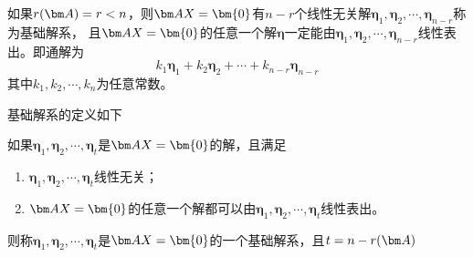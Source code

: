 \begin{theorem}
    如果$r(\mat{A})=r<n$，则$\mat{AX}=\bm{0}$有$n-r$个线性无关解$\bm{\eta}_1,\bm{\eta}_2,\cdots,\bm{\eta}_{n-r}$称为基础解系，
    且$\mat{AX}=\bm{0}$的任意一个解$\bm{\eta}$一定能由$\bm{\eta}_1,\bm{\eta}_2,\cdots,\bm{\eta}_{n-r}$线性表出。即通解为
    \[ k_1\bm{\eta}_1 + k_2\bm{\eta}_2 + \cdots + k_{n-r}\bm{\eta}_{n-r} \]
    其中$k_1,k_2,\cdots,k_n$为任意常数。
\end{theorem}

基础解系的定义如下
\begin{definition}
    如果$\bm{\eta}_1,\bm{\eta}_2,\cdots,\bm{\eta}_t$是$\mat{AX}=\bm{0}$的解，且满足
    \begin{enumerate}[(1)]
        \item $\bm{\eta}_1,\bm{\eta}_2,\cdots,\bm{\eta}_t$线性无关；
        \item $\mat{AX}=\bm{0}$的任意一个解都可以由$\bm{\eta}_1,\bm{\eta}_2,\cdots,\bm{\eta}_t$线性表出。
    \end{enumerate}
    则称$\bm{\eta}_1,\bm{\eta}_2,\cdots,\bm{\eta}_t$是$\mat{AX}=\bm{0}$的一个基础解系，且$t=n-r(\mat{A})$
\end{definition}

